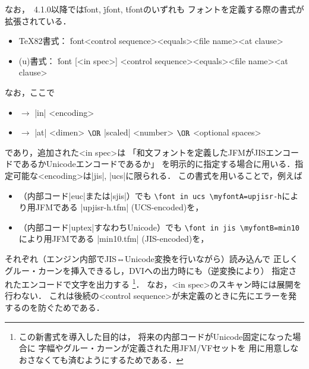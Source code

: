 \documentclass[a4paper,11pt,nomag,dvipdfmx]{jsarticle}
\def\_{\leavevmode\vrule width .45em height -.2ex depth .3ex\relax}
\begin{document}
なお，\pTeX~4.1.0以降では\.{font}, \.{jfont}, \.{tfont}のいずれも
フォントを定義する際の書式が拡張されている．
\begin{itemize}
 \item \TeX82書式：
   \.{font}<control sequence><equals><file name><at clause>
 \item (u)\pTeX 書式：
   \.{font} [<in spec>] <control sequence><equals><file name><at clause>
\end{itemize}
なお，ここで
\begin{itemize}
 \item <in spec> $\longrightarrow$ |in| <encoding>
 \item <at clause> $\longrightarrow$ |at| <dimen> $\OR$ |scaled| <number> $\OR$ <optional spaces>
\end{itemize}
であり，追加された<in spec>は
「和文フォントを定義したJFMがJISエンコードであるかUnicodeエンコードであるか」
を明示的に指定する場合に用いる．指定可能な<encoding>は|jis|, |ucs|に限られる．
この書式を用いることで，例えば
\begin{itemize}
 \item \pTeX（内部コード|euc|または|sjis|）でも
   \verb|\font in ucs \myfontA=upjisr-h|により\upTeX 用JFMである
   |upjisr-h.tfm| (UCS-encoded)を，
 \item \upTeX（内部コード|uptex|すなわちUnicode）でも
   \verb|\font in jis \myfontB=min10|により\pTeX 用JFMである
   |min10.tfm| (JIS-encoded)を，
\end{itemize}
それぞれ（エンジン内部でJIS⇔Unicode変換を行いながら）読み込んで
正しくグルー・カーンを挿入できるし，DVIへの出力時にも（逆変換により）
指定されたエンコードで文字を出力する
\footnote{この新書式を導入した目的は，
将来\upTeX の内部コードがUnicode固定になった場合に
字幅やグルー・カーンが定義された\pTeX 用JFM/VFセットを
\upTeX 用に用意しなおさなくても済むようにするためである\cite{tjb149}．}．
なお，<in spec>のスキャン時には展開を行わない．
これは後続の<control sequence>が未定義のときに先にエラーを発するのを防ぐためである．
\end{document}
